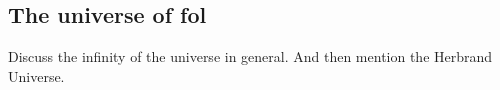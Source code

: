 \subsection{The universe of \ac{fol}}\label{sub:c2s1s2}
Discuss the infinity of the universe in general.\newline
And then mention the Herbrand Universe. 